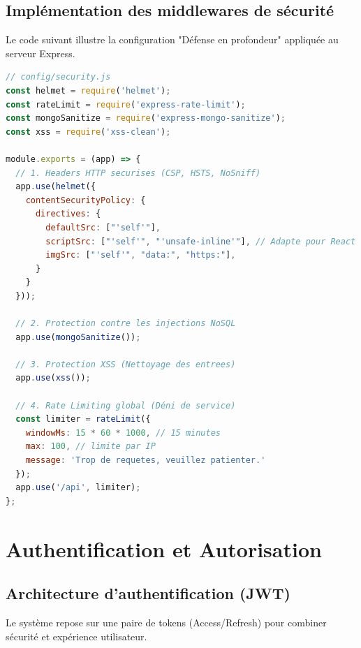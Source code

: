 \subsection{Implémentation des middlewares de sécurité}

Le code suivant illustre la configuration "Défense en profondeur" appliquée au serveur Express.

\begin{lstlisting}[language=JavaScript, caption={Configuration de sécurité Express (Helmet, Rate Limit, Sanitize)}]
// config/security.js
const helmet = require('helmet');
const rateLimit = require('express-rate-limit');
const mongoSanitize = require('express-mongo-sanitize');
const xss = require('xss-clean');

module.exports = (app) => {
  // 1. Headers HTTP securises (CSP, HSTS, NoSniff)
  app.use(helmet({
    contentSecurityPolicy: {
      directives: {
        defaultSrc: ["'self'"],
        scriptSrc: ["'self'", "'unsafe-inline'"], // Adapte pour React
        imgSrc: ["'self'", "data:", "https:"],
      }
    }
  }));

  // 2. Protection contre les injections NoSQL
  app.use(mongoSanitize());

  // 3. Protection XSS (Nettoyage des entrees)
  app.use(xss());

  // 4. Rate Limiting global (Déni de service)
  const limiter = rateLimit({
    windowMs: 15 * 60 * 1000, // 15 minutes
    max: 100, // limite par IP
    message: 'Trop de requetes, veuillez patienter.'
  });
  app.use('/api', limiter);
};
\end{lstlisting}

\section{Authentification et Autorisation}



\subsection{Architecture d'authentification (JWT)}

Le système repose sur une paire de tokens (Access/Refresh) pour combiner sécurité et expérience utilisateur.

